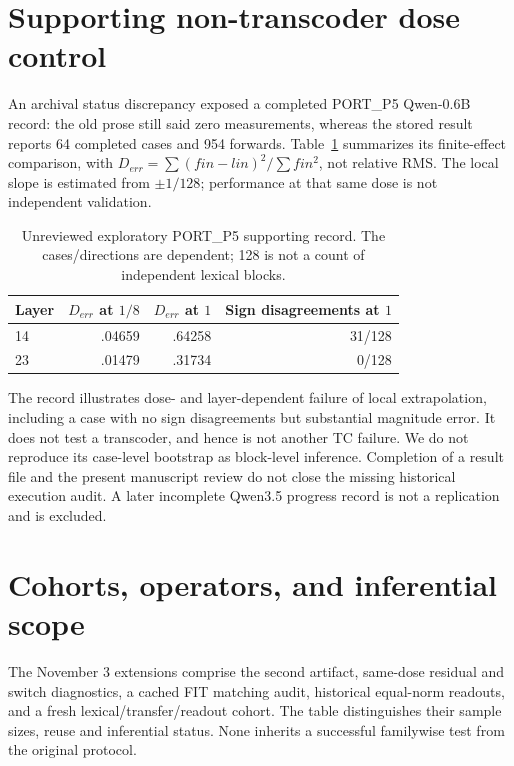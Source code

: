 \section{Supporting non-transcoder dose control}\label{app:port}
An archival status discrepancy exposed a completed PORT\_P5 Qwen-0.6B record: the old prose still said zero measurements, whereas the stored result reports 64 completed cases and 954 forwards. Table~\ref{tab:port-dose} summarizes its finite-effect comparison, with $D_{err}=\sum(fin-lin)^2/\sum fin^2$, not relative RMS. The local slope is estimated from $\pm1/128$; performance at that same dose is not independent validation.
\begin{table}[ht]
\centering\small
\begin{tabular}{lrrr}
\toprule Layer & $D_{err}$ at $1/8$ & $D_{err}$ at $1$ & Sign disagreements at $1$\\
\midrule
14 & .04659 & .64258 & 31/128\\
23 & .01479 & .31734 & 0/128\\
\bottomrule
\end{tabular}
\caption{Unreviewed exploratory PORT\_P5 supporting record. The cases/directions are dependent; 128 is not a count of independent lexical blocks.}\label{tab:port-dose}
\end{table}
The record illustrates dose- and layer-dependent failure of local extrapolation, including a case with no sign disagreements but substantial magnitude error. It does not test a transcoder, and hence is not another TC failure. We do not reproduce its case-level bootstrap as block-level inference. Completion of a result file and the present manuscript review do not close the missing historical execution audit. A later incomplete Qwen3.5 progress record is not a replication and is excluded.


\section{Cohorts, operators, and inferential scope}
The November 3 extensions comprise the second artifact, same-dose residual and switch diagnostics, a cached FIT matching audit, historical equal-norm readouts, and a fresh lexical/transfer/readout cohort. The table distinguishes their sample sizes, reuse and inferential status. None inherits a successful familywise test from the original protocol.

